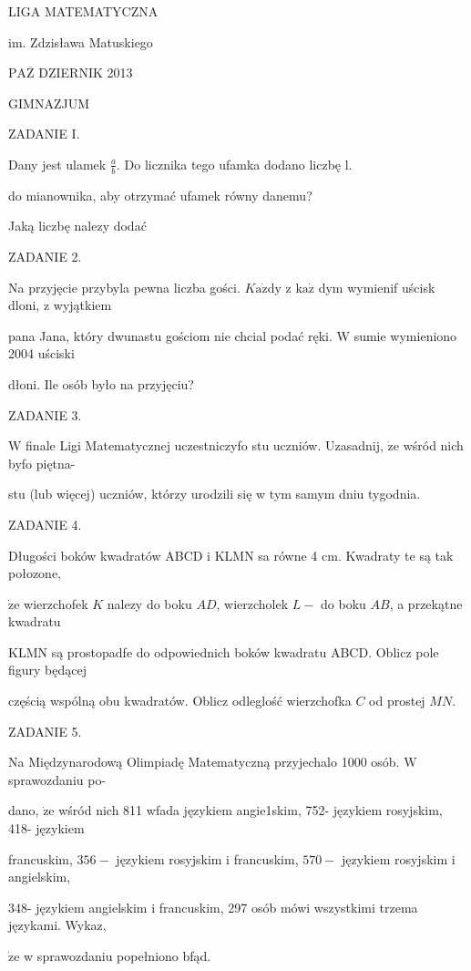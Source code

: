 \documentclass[a4paper,12pt]{article}
\begin{document}
LIGA MATEMATYCZNA

im. Zdzisława Matuskiego

$\mathrm{P}\mathrm{A}\overline{\mathrm{Z}}$ DZIERNIK 2013

GIMNAZJUM

ZADANIE I.

Dany jest ulamek $\displaystyle \frac{a}{b}$. Do licznika tego ufamka dodano liczbę l.

do mianownika, aby otrzymać ufamek równy danemu?

Jaką liczbę nalezy dodać

ZADANIE 2.

Na przyjęcie przybyla pewna liczba gości. $K\mathrm{a}\dot{\mathrm{z}}\mathrm{d}\mathrm{y}$ z $\mathrm{k}\mathrm{a}\dot{\mathrm{z}}$ dym wymienif uścisk dloni, z wyjątkiem

pana Jana, który dwunastu gościom nie chcial podać ręki. $\mathrm{W}$ sumie wymieniono 2004 uściski

dłoni. Ile osób było na przyjęciu?

ZADANIE 3.

$\mathrm{W}$ finale Ligi Matematycznej uczestniczyfo stu uczniów. Uzasadnij, $\dot{\mathrm{z}}\mathrm{e}$ wśród nich byfo piętna-

stu (lub więcej) uczniów, którzy urodzili się w tym samym dniu tygodnia.

ZADANIE 4.

Długości boków kwadratów ABCD $\mathrm{i}$ KLMN sa równe 4 cm. Kwadraty te są tak połozone,

$\dot{\mathrm{z}}\mathrm{e}$ wierzchofek $K$ nalezy do boku $AD$, wierzcholek $L-$ do boku $AB$, a przekątne kwadratu

KLMN są prostopadfe do odpowiednich boków kwadratu ABCD. Oblicz pole figury będącej

częścią wspólną obu kwadratów. Oblicz odleglość wierzchofka $C$ od prostej $MN.$

ZADANIE 5.

Na Międzynarodową Olimpiadę Matematyczną przyjechalo 1000 osób. $\mathrm{W}$ sprawozdaniu po-

dano, $\dot{\mathrm{z}}\mathrm{e}$ wśród nich 811 wfada językiem angie1skim, 752- językiem rosyjskim, 418- językiem

francuskim, $356 -$ językiem rosyjskim i francuskim, $570 -$ językiem rosyjskim i angielskim,

348- językiem angielskim i francuskim, 297 osób mówi wszystkimi trzema językami. Wykaz,

$\dot{\mathrm{z}}\mathrm{e}$ w sprawozdaniu popełniono bfąd.
\end{document}
